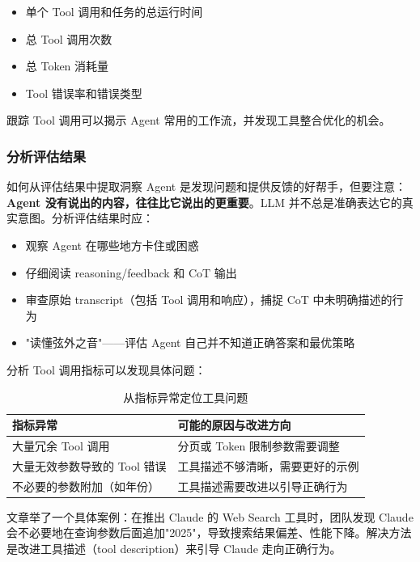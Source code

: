 \begin{itemize}[leftmargin=1.5em]
    \item 单个 Tool 调用和任务的总运行时间
    \item 总 Tool 调用次数
    \item 总 Token 消耗量
    \item Tool 错误率和错误类型
\end{itemize}

跟踪 Tool 调用可以揭示 Agent 常用的工作流，并发现工具整合优化的机会。

\subsubsection{分析评估结果}

\begin{knowledgebox}{如何从评估结果中提取洞察}
Agent 是发现问题和提供反馈的好帮手，但要注意：\textbf{Agent 没有说出的内容，往往比它说出的更重要}。LLM 并不总是准确表达它的真实意图。分析评估结果时应：
\begin{itemize}[leftmargin=1.5em]
    \item 观察 Agent 在哪些地方卡住或困惑
    \item 仔细阅读 reasoning/feedback 和 CoT 输出
    \item 审查原始 transcript（包括 Tool 调用和响应），捕捉 CoT 中未明确描述的行为
    \item "读懂弦外之音"——评估 Agent 自己并不知道正确答案和最优策略
\end{itemize}
\end{knowledgebox}

分析 Tool 调用指标可以发现具体问题：

\begin{table}[H]
\centering
\caption{从指标异常定位工具问题}
\begin{tabular}{p{}p{}}
\toprule
\textbf{指标异常} & \textbf{可能的原因与改进方向} \\
\midrule
大量冗余 Tool 调用 & 分页或 Token 限制参数需要调整 \\
\midrule
大量无效参数导致的 Tool 错误 & 工具描述不够清晰，需要更好的示例 \\
\midrule
不必要的参数附加（如年份） & 工具描述需要改进以引导正确行为 \\
\bottomrule
\end{tabular}
\end{table}

文章举了一个具体案例：在推出 Claude 的 Web Search 工具时，团队发现 Claude 会不必要地在查询参数后面追加"2025"，导致搜索结果偏差、性能下降。解决方法是改进工具描述（tool description）来引导 Claude 走向正确行为。

